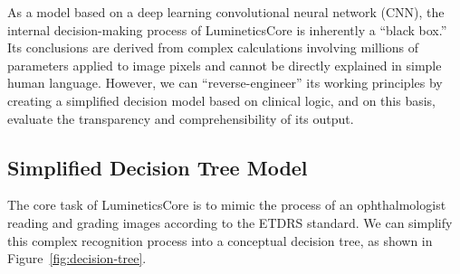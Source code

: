 \documentclass[sigplan,screen]{acmart}
\begin{document}
As a model based on a deep learning convolutional neural network (CNN), the internal decision-making process of LumineticsCore is inherently a ``black box.'' Its conclusions are derived from complex calculations involving millions of parameters applied to image pixels and cannot be directly explained in simple human language. However, we can ``reverse-engineer'' its working principles by creating a simplified decision model based on clinical logic, and on this basis, evaluate the transparency and comprehensibility of its output.

\subsection{Simplified Decision Tree Model}

The core task of LumineticsCore is to mimic the process of an ophthalmologist reading and grading images according to the ETDRS standard. We can simplify this complex recognition process into a conceptual decision tree, as shown in Figure~\ref{fig:decision-tree}.
\end{document}
